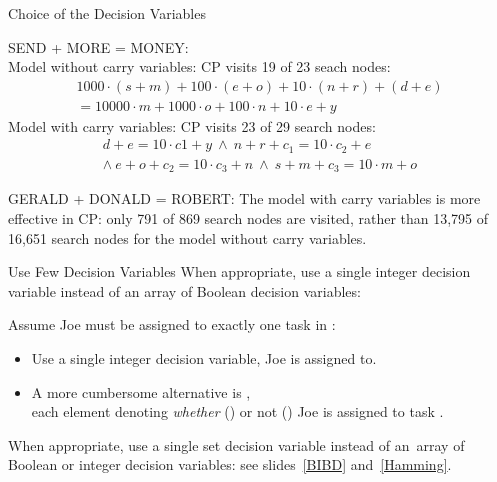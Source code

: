 \documentclass{cons-beamer}
\begin{document}
\begin{flashcardminizinc}
\begin{frame}{Choice of the Decision Variables}
  \begin{examples}
    SEND + MORE = MONEY: \\
    Model without carry variables: CP visits 19 of 23 seach nodes:
    \vspace{-2mm}
    \[
    \begin{array}{c}  %
      1000 \cdot (s+m) + 100 \cdot (e+o) + 10 \cdot (n+r) + (d+e) \\
      =  10000 \cdot m + 1000 \cdot o + 100 \cdot n + 10 \cdot e + y
    \end{array}
    \]
    Model with carry variables: CP visits 23 of 29 search nodes:
    \vspace{-2mm}
    \[
    \begin{array}{c}
      d + e = 10 \cdot c1 + y ~\land~
      n + r + c_1 = 10 \cdot c_2 + e \\
      \land~
      e + o + c_2 = 10 \cdot c_3 + n ~\land~
      s + m + c_3 = 10 \cdot m + o
    \end{array}
    \]
    
    GERALD + DONALD = ROBERT: The model with carry variables is more
    effective in CP: only 791 of 869 search nodes are visited, rather than
    13,795 of 16,651 search nodes for the model without carry
    variables.
  \end{examples}
\end{frame}

\begin{frame}{Use Few Decision Variables}
  When appropriate, use a \alert{single} integer decision variable
  instead of an \alert{array} of Boolean decision variables:
  \begin{example}
    Assume Joe must be assigned to exactly one task in
    : \vfill
    \begin{itemize}
    \item Use a \alert{single} integer decision variable,
      Joe is assigned to.  \vfill
    \item A more cumbersome alternative is 
      , \\
      each element  denoting \emph{whether}
      () or not () Joe is assigned to
      task 
      .
    \end{itemize}
  \end{example}\vfill
  When appropriate, use a \alert{single} set decision variable instead
  of an~\alert{array} of Boolean or integer decision variables: see
  slides~\ref{BIBD} and~\ref{Hamming}.
\end{frame}


\end{flashcardminizinc}
\end{document}
